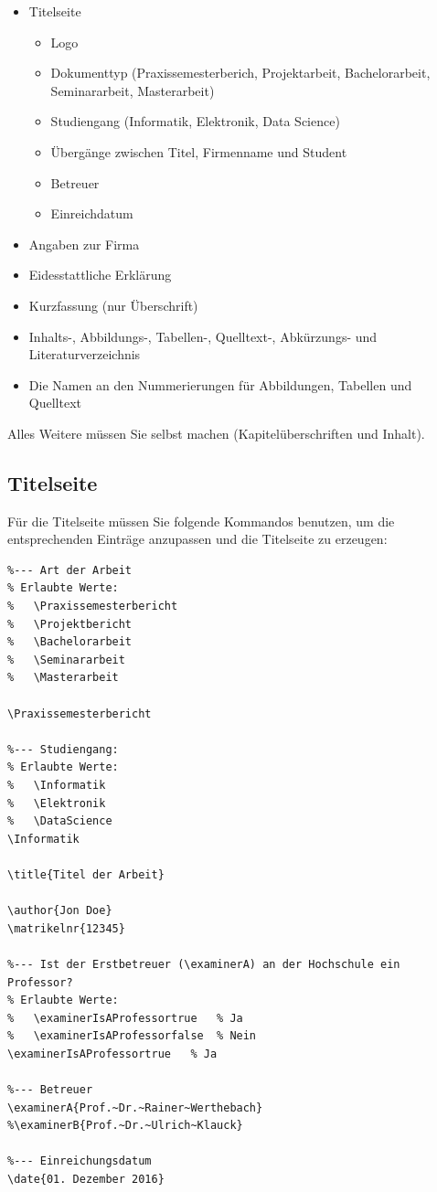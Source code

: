 \documentclass[pdftex,abstracton,a4paper]{scrartcl}
\begin{document}
\begin{itemize}
  \item Titelseite
  \begin{itemize}
    \item Logo
    \item Dokumenttyp (Praxissemesterberich, Projektarbeit, Bachelorarbeit, Seminararbeit, Masterarbeit)
    \item Studiengang (Informatik, Elektronik, Data Science)
    \item Übergänge zwischen Titel, Firmenname und Student
    \item Betreuer
    \item Einreichdatum
  \end{itemize}
  \item Angaben zur Firma
  \item Eidesstattliche Erklärung
  \item Kurzfassung (nur Überschrift)
  \item Inhalts-, Abbildungs-, Tabellen-, Quelltext-, Abkürzungs- und Literaturverzeichnis
  \item Die Namen an den Nummerierungen für Abbildungen, Tabellen und Quelltext
\end{itemize}

Alles Weitere müssen Sie selbst machen (Kapitelüberschriften und Inhalt).
 
\subsection{Titelseite}
\label{sec:titleseite}
Für die Titelseite müssen Sie folgende Kommandos benutzen, um die entsprechenden Einträge anzupassen und die Titelseite zu erzeugen:

\begin{verbatim}
%--- Art der Arbeit
% Erlaubte Werte:
%   \Praxissemesterbericht
%   \Projektbericht
%   \Bachelorarbeit
%   \Seminararbeit
%   \Masterarbeit

\Praxissemesterbericht

%--- Studiengang:
% Erlaubte Werte:
%   \Informatik
%   \Elektronik
%   \DataScience
\Informatik

\title{Titel der Arbeit}

\author{Jon Doe}
\matrikelnr{12345}

%--- Ist der Erstbetreuer (\examinerA) an der Hochschule ein Professor?
% Erlaubte Werte:
%   \examinerIsAProfessortrue   % Ja
%   \examinerIsAProfessorfalse  % Nein
\examinerIsAProfessortrue   % Ja

%--- Betreuer
\examinerA{Prof.~Dr.~Rainer~Werthebach}
%\examinerB{Prof.~Dr.~Ulrich~Klauck}

%--- Einreichungsdatum
\date{01. Dezember 2016}
\end{verbatim}
\end{document}
